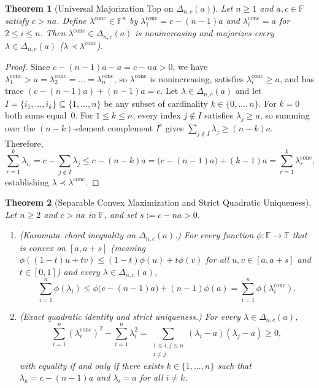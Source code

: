 \documentclass[11pt]{article}
\newtheorem{theorem}{Theorem}[section]
\theoremstyle{definition}
\theoremstyle{remark}
\begin{document}
\begin{theorem}[Universal Majorization Top on $\Delta_{n,c}(a)$]
\label{thm:simplex-maj}
Let $n \ge 1$ and $a, c \in \mathbb{F}$ satisfy $c > n a$. Define $\lambda^{\mathrm{conc}} \in \mathbb{F}^n$ by $\lambda_1^{\mathrm{conc}} = c - (n-1)a$ and $\lambda_i^{\mathrm{conc}} = a$ for $2 \le i \le n$. Then $\lambda^{\mathrm{conc}} \in \Delta_{n,c}(a)$ is nonincreasing and majorizes every $\lambda \in \Delta_{n,c}(a)$ ($\lambda \prec \lambda^{\mathrm{conc}}$).
\end{theorem}

\begin{proof}
Since $c - (n-1)a - a = c - n a > 0$, we have $\lambda_1^{\mathrm{conc}} > a = \lambda_2^{\mathrm{conc}} = \dots = \lambda_n^{\mathrm{conc}}$, so $\lambda^{\mathrm{conc}}$ is nonincreasing, satisfies $\lambda_i^{\mathrm{conc}} \ge a$, and has trace $(c - (n-1)a) + (n-1)a = c$. Let $\lambda \in \Delta_{n,c}(a)$ and let $I = \{i_1, \dots, i_k\} \subseteq \{1, \dots, n\}$ be any subset of cardinality $k \in \{0, \dots, n\}$. For $k = 0$ both sums equal~$0$. For $1 \le k \le n$, every index $j \notin I$ satisfies $\lambda_j \ge a$, so summing over the $(n - k)$-element complement $I^c$ gives $\sum_{j \notin I} \lambda_j \ge (n - k) a$. Therefore,
\[
  \sum_{r=1}^k \lambda_{i_r}
  = c - \sum_{j \notin I} \lambda_j
  \le c - (n - k) a
  = \bigl(c - (n - 1)a\bigr) + (k - 1)a
  = \sum_{r=1}^k \lambda_r^{\mathrm{conc}},
\]
establishing $\lambda \prec \lambda^{\mathrm{conc}}$.
\end{proof}

\begin{theorem}[Separable Convex Maximization and Strict Quadratic Uniqueness]
\label{thm:simplex-convex}
Let $n \ge 2$ and $c > n a$ in $\mathbb{F}$, and set $s := c - n a > 0$.
\begin{enumerate}
  \item \emph{(Karamata--chord inequality on $\Delta_{n,c}(a)$.)} For every function $\phi : \mathbb{F} \to \mathbb{F}$ that is convex on $[a, a + s]$ (meaning $\phi((1-t)u + t v) \le (1-t)\phi(u) + t\phi(v)$ for all $u,v \in [a, a+s]$ and $t \in [0,1]$) and every $\lambda \in \Delta_{n,c}(a)$,
  \[
    \sum_{i=1}^n \phi(\lambda_i) \le \phi\bigl(c - (n-1)a\bigr) + (n - 1)\phi(a) = \sum_{i=1}^n \phi(\lambda_i^{\mathrm{conc}}).
  \]
  \item \emph{(Exact quadratic identity and strict uniqueness.)} For every $\lambda \in \Delta_{n,c}(a)$,
  \begin{equation}
    \label{eq:f2-gap}
    \sum_{i=1}^n (\lambda_i^{\mathrm{conc}})^2 - \sum_{i=1}^n \lambda_i^2
    = \sum_{\substack{1 \le i, j \le n \\ i \neq j}} (\lambda_i - a)(\lambda_j - a) \ge 0,
  \end{equation}
  with equality if and only if there exists $k \in \{1, \dots, n\}$ such that $\lambda_k = c - (n-1)a$ and $\lambda_i = a$ for all $i \neq k$.
\end{enumerate}
\end{theorem}
\end{document}

